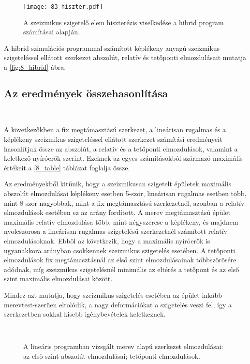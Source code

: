 \begin{figure}[h!]
\centering
\texttt{[image: 83\_hiszter.pdf]}
\caption{A szeizmikus szigetelő elem  hiszterézis viselkedése a hibrid program számításai alapján.}
\label{fig:hiszt}
\end{figure}

  
A hibrid szimulációs programmal számított képlékeny anyagú szeizmikus szigeteléssel ellátott szerkezet abszolút, relatív és tetőponti elmozdulásait mutatja a \ref{fig:8_hibrid} ábra.





\subsection{Az eredmények összehasonlítása}

{\ }

A következőkben a fix megtámasztású szerkezet, a lineárisan rugalmas és a képlékeny szeizmikus szigeteléssel ellátott szerkezet számítási eredményeit hasonlítjuk össze az abszolút, a relatív és a tetőponti elmozdulások, valamint a keletkező  nyíróerők szerint. Ezeknek az egyes számításokból származó maximális értékeit a \ref{8_table} táblázat foglalja össze.

Az eredményekből kitűnik, hogy a szeizmikusan szigetelt épületek maximális abszolút elmozdulásai képlékeny esetben 5-ször, lineárisan rugalmas esetben több, mint 8-szor nagyobbak, mint a fix megtámasztású szerkezetnél, azonban a relatív elmozdulások esetében ez az arány fordított. A merev megtámasztású épület maximális relatív elmozdulása több, mint négyszerese a képlékeny, és majdnem nyolcszorosa a lineárisan rugalmas szigetelésű szerkezetnél számított relatív elmozdulásoknak. Ebből az következik, hogy  a maximális nyíróerők is ugyanakkora arányban csökkennek szeizmikus szigetelés esetében. A tetőponti elmozdulások fix megtámasztásnál az első szint elmozdulásainak többszörösére adódnak, míg szeizmikus szigetelésnél minimális az eltérés a tetőpont és az első szint maximális elmozdulásai között.

Mindez azt mutatja, hogy szeizmikus szigetelés esetében az épület inkább merevtest-szerűen eltolódik, a nagy deformációkat a szigetelés veszi fel, így a szerkezetben sokkal kisebb igénybevételek keletkeznek. 

\begin{figure}[!ht]%
\centering
{}%
\\
%
\caption[A lineáris programban vizsgált merev alapú  szerkezet elmozdulásai.]{A lineáris programban vizsgált merev alapú  szerkezet elmozdulásai:
 az első szint abszolút elmozdulásai; 
 tetőponti elmozdulások.}%
\label{fig:8_linfix}%
\end{figure}

